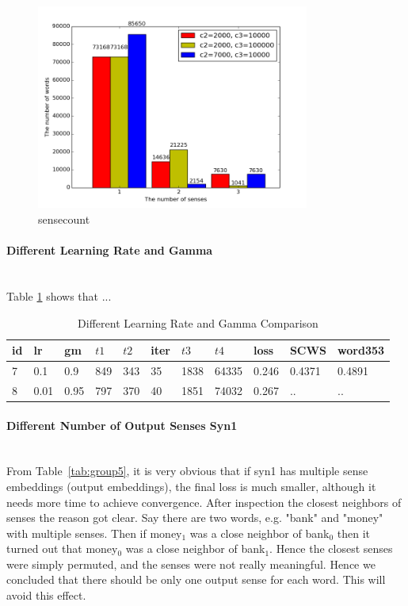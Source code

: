 \begin{figure}[tb]
  \centering
	\includegraphics[width=0.8\textwidth]{sensecount} 
	\caption{sensecount}
	\label{fig:sensecount}
\end{figure}


\paragraph{Different Learning Rate and Gamma} \ \\
Table \ref{tab:group4} shows that ...

\begin{table}[tb]

\caption{Different Learning Rate and Gamma Comparison} \label{tab:group4} 
\begin{center}
\begin{tabular}{|l|l|l|l|l|l|l|l|l|l|l|}
\hline
id& lr & gm & $t1$ & $t2$ & iter & $t3$ & $t4$ &    loss  & 	SCWS & 	word353	  \\ 
\hline
7	& 0.1		& 0.9		& 849	& 343	& 35	& 1838 &	64335  & 0.246 &0.4371	&0.4891	  \\ 
\hline
8	& 0.01		& 0.95		& 797	& 370	& 40	& 1851 &	74032  & 0.267 &..	&..	  \\ 
\hline
\end{tabular}
\end{center}
\end{table}
\clearpage

\paragraph{Different Number of Output Senses Syn1}  \ \\
From Table~\ref{tab:group5}, it is very obvious that if syn1 has multiple sense embeddings (output embeddings), the final loss is much smaller, although it needs more time to achieve convergence. After inspection the closest neighbors of senses the reason got clear. Say there are two words, e.g. "bank" and "money" with multiple senses. Then if money$_1$ was a close neighbor of bank$_0$ then it turned out that money$_0$ was a close neighbor of bank$_1$. Hence the closest senses were simply permuted, and the senses were not really meaningful. Hence we concluded that there should be only one output sense for each word. This will avoid this effect. 



